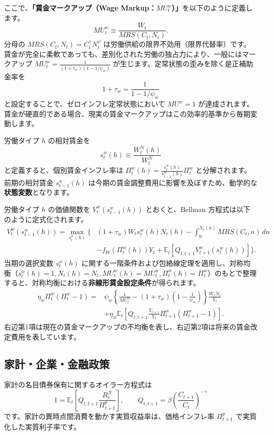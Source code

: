 \documentclass[
  japanese,
  lualatex,
  ja=standard,
  12pt,
  a4paper]{ltjsarticle}
\begin{document}
ここで、\textbf{「賃金マークアップ（Wage
Markup：\(MU_t^w\)）」}を以下のように定義します。 \[
MU_t^w
\equiv
\frac{W_t}{MRS(C_t,N_t)}.
\] 分母の \(MRS(C_t, N_t) = C_t^\gamma N_t^\varphi\)
は労働供給の限界不効用（限界代替率）です。賃金が完全に柔軟であっても、差別化された労働の独占力により、一般にはマークアップ
\(MU_t^w = \frac{1}{(1+\tau_w)(1-1/\psi_w)}\)
が生じます。定常状態の歪みを除く是正補助金率を \[
1+\tau_w=\frac{1}{1-1/\psi_w}
\] と設定することで、ゼロインフレ定常状態において \(MU^w=1\)
が達成されます。賃金が硬直的である場合、現実の賃金マークアップはこの効率的基準から毎期変動します。

労働タイプ \(h\) の相対賃金を \[
s_t^w(h)\equiv \frac{W_t^N(h)}{W_t^N}
\] と定義すると、個別賃金インフレ率は
\(\Pi_t^w(h) = \frac{s_t^w(h)}{s_{t-1}^w(h)}\Pi_t^w\)
と分解されます。前期の相対賃金 \(s_{t-1}^w(h)\)
は今期の賃金調整費用に影響を及ぼすため、動学的な\textbf{状態変数}となります。

労働タイプ \(h\) の価値関数を \(V_t^w(s_{t-1}^w(h))\) とおくと、Bellman
方程式は以下のように定式化されます。 \[
\begin{aligned}
V_t^w(s_{t-1}^w(h))
=
\max_{s_t^w(h)}
\Bigg\{
&
(1+\tau_w)W_t s_t^w(h)N_t(h)
-
\int_0^{N_t(h)}
MRS(C_t,n)\,dn
\\
&
-f_W(\Pi_t^w(h))Y_t
+
\mathbb{E}_t
\left[
Q_{t,t+1}V_{t+1}^w(s_t^w(h))
\right]
\Bigg\}.
\end{aligned}
\] 当期の選択変数 \(s_t^w(h)\)
に関する一階条件および包絡線定理を適用し、対称均衡（\(s_t^w(h)=1, N_t(h)=N_t, MU_t^w(h)=MU_t^w, \Pi_t^w(h)=\Pi_t^w\)）のもとで整理すると、対称均衡における\textbf{非線形賃金設定条件}が得られます。
\[
\begin{aligned}
\eta_w\Pi_t^w(\Pi_t^w-1)
={} &
\psi_w
\left\{
\frac{1}{MU_t^w}
-
(1+\tau_w)\left(1-\frac{1}{\psi_w}\right)
\right\}
\frac{W_tN_t}{Y_t}
\\
&+
\eta_w\mathbb{E}_t
\left[
Q_{t,t+1}
\frac{Y_{t+1}}{Y_t}
\Pi_{t+1}^w(\Pi_{t+1}^w-1)
\right].
\end{aligned}
\]
右辺第1項は現在の賃金マークアップの不均衡を表し、右辺第2項は将来の賃金改定費用を表しています。

\subsection{家計・企業・金融政策}\label{ux5bb6ux8a08ux4f01ux696dux91d1ux878dux653fux7b56}

家計の名目債券保有に関するオイラー方程式は \[
1
=
\mathbb{E}_t
\left[
Q_{t,t+1}
\frac{R_t^N}{\Pi_{t+1}^p}
\right],
\qquad
Q_{t,t+1}
=
\beta
\left(\frac{C_{t+1}}{C_t}\right)^{-\gamma}
\] です。家計の異時点間消費を動かす実質収益率は、価格インフレ率
\(\Pi_{t+1}^p\) で実質化した実質利子率です。
\end{document}
